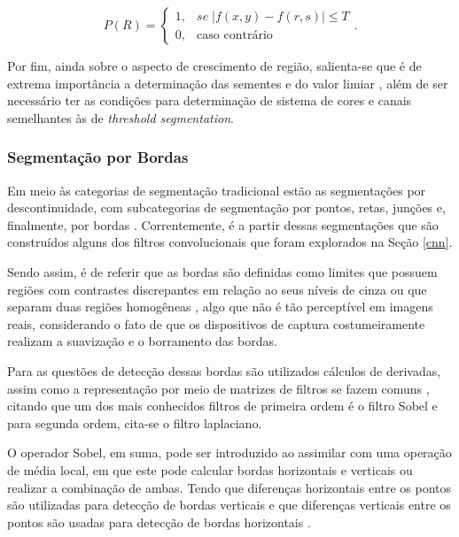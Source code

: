 \begin{equation}
\label{segment:eq:3}
P(R) = \begin{cases}
    1, & se \; |f(x,y) - f(r,s)| \leq T \\
    0,      &  \text{caso contrário}
\end{cases}.
\end{equation}

Por fim, ainda sobre o aspecto de crescimento de região, salienta-se que é de extrema importância a determinação das sementes e do valor limiar \citep{Yuheng2017, pedrini2008analise}, além de ser necessário ter as condições para determinação de sistema de cores e canais semelhantes às de \textit{threshold segmentation}.


\subsubsection{Segmentação por Bordas}
\label{segment:limit}

Em meio às categorias de segmentação tradicional estão as segmentações por descontinuidade, com subcategorias de segmentação por pontos, retas, junções e, finalmente, por bordas \citep{pedrini2008analise}. Correntemente, é a partir dessas segmentações que são construídos alguns dos filtros convolucionais que foram explorados na Seção \ref{cnn}.

Sendo assim, é de referir que as bordas são definidas como limites que possuem regiões com contrastes discrepantes em relação ao seus níveis de cinza  ou que separam duas regiões homogêneas \citep{pedrini2008analise,Yuheng2017}, algo que não é tão perceptível em imagens reais, considerando o fato de que os dispositivos de captura costumeiramente realizam a suavização e o borramento das bordas.

Para as questões de detecção dessas bordas são utilizados cálculos de derivadas, assim  como a representação por meio de matrizes de filtros se fazem comuns \citep{pedrini2008analise, muthukrishnan2011edge}, citando que um dos mais conhecidos filtros de primeira ordem é o filtro Sobel e para segunda ordem, cita-se o filtro laplaciano.

O operador Sobel, em suma, pode ser introduzido ao assimilar com uma operação de média local, em que este pode calcular bordas horizontais e verticais ou realizar a combinação de ambas. Tendo que diferenças horizontais entre os pontos são utilizadas para detecção de bordas verticais e que diferenças verticais entre os pontos são usadas para detecção de bordas horizontais \citep{pedrini2008analise}.

